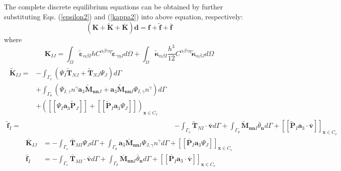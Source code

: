 The complete discrete equilibrium equations can be obtained by further substituting Eqs. (\ref{epsilon2}) and (\ref{kappa2}) into above equation, respectively: 
\begin{equation}
        (\boldsymbol K + \tilde{\boldsymbol K} + \bar{\boldsymbol K} )\boldsymbol d = \boldsymbol f + \tilde{\boldsymbol f} + \bar{\boldsymbol f}
\end{equation}
where
\begin{equation}\label{de1}
        \boldsymbol K_{IJ} = \int_\Omega \tilde{\boldsymbol \varepsilon}_{\alpha\beta I} hC^{\alpha\beta\gamma\eta}\tilde{\boldsymbol \varepsilon}_{\gamma\eta J} d\Omega + \int_\Omega \tilde{\boldsymbol \kappa}_{\alpha\beta I} \frac{h^3}{12}C^{\alpha\beta\gamma\eta} \tilde{\boldsymbol \kappa}_{\alpha\beta J} d\Omega
\end{equation}
\begin{subequations}\label{de2}
\begin{align}
\begin{split}
        \tilde{\boldsymbol K}_{IJ} = &- \int_{\Gamma_v} (\Psi_I \tilde{\boldsymbol T}_{NJ} + \tilde{\boldsymbol T}_{NJ} \Psi_J) d\Gamma \\
                                     &+ \int_{\Gamma_\theta} (\Psi_{I,\gamma} n^\gamma \boldsymbol a_3 \tilde{\boldsymbol M}_{\boldsymbol{nn}J} + \boldsymbol a_3 \tilde{\boldsymbol M}_{\boldsymbol{nn}I} \Psi_{I,\gamma}n^\gamma)d\Gamma \\
                                     & + ([[\Psi_I \boldsymbol a_3 \tilde{\boldsymbol P}_J]] + [[\tilde{\boldsymbol P}_I \boldsymbol a_3 \Psi_J]])_{\boldsymbol x \in C_v}
\end{split} \\
\tilde{\boldsymbol f}_I = &- \int_{\Gamma_v} \tilde{\boldsymbol T}_{NI} \cdot \bar{\boldsymbol v} d\Gamma + \int_{\Gamma_\theta} \tilde{\boldsymbol M}_{\boldsymbol{nn}I} \bar{\theta}_{\boldsymbol n} d\Gamma + [[\tilde{\boldsymbol P}_I\boldsymbol a_3 \cdot \bar{\boldsymbol v}]]_{\boldsymbol x \in C_v}
\end{align}
\end{subequations}
\begin{subequations}\label{de3}
\begin{align}
\bar{\boldsymbol K}_{IJ} &= - \int_{\Gamma_v} \bar{\boldsymbol T}_{MI} \Psi_J d\Gamma 
+ \int_{\Gamma_\theta} \boldsymbol a_3\bar{\boldsymbol M}_{\boldsymbol{nn}I} \Psi_{J,\gamma}n^\gamma d\Gamma + [[\bar{\boldsymbol P}_I \boldsymbol a_3 \Psi_J]]_{\boldsymbol x \in C_v} \\
\bar{\boldsymbol f}_I &= - \int_{\Gamma_v} \bar{\boldsymbol T}_{MI} \cdot \bar{\boldsymbol v} d\Gamma + \int_{\Gamma_\theta} \bar{\boldsymbol M}_{\boldsymbol{nn} I} \bar{\theta}_{\boldsymbol n} d\Gamma + [[\bar{\boldsymbol P}_I\boldsymbol a_3 \cdot \bar{\boldsymbol v}]]_{\boldsymbol x \in C_v}
\end{align}
\end{subequations}


